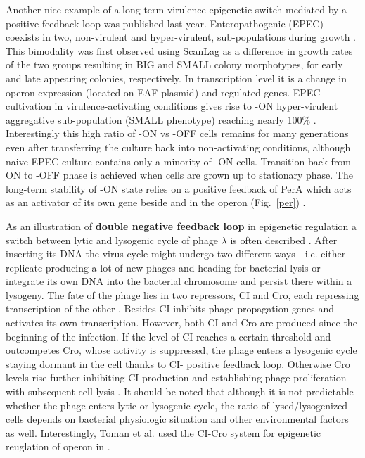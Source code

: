 Another nice example of a long-term virulence epigenetic switch mediated by a positive feedback loop was published last year.
Enteropathogenic  (EPEC) coexists in two, non-virulent and hyper-virulent, sub-populations during growth \cite{ronin2017long}.
This bimodality was first observed  using ScanLag \cite{levin2014scanlag} as a difference in growth rates of the two groups resulting in BIG and SMALL colony morphotypes, for early and late appearing colonies, respectively.
In transcription level it is a change in  operon expression (located on EAF plasmid) and  regulated genes.
EPEC cultivation in virulence-activating conditions gives rise to -ON hyper-virulent aggregative sub-population (SMALL phenotype) reaching nearly 100\% \cite{ronin2017long}.
Interestingly this high ratio of -ON vs -OFF cells remains for many generations even after transferring the culture back into non-activating conditions, although naive EPEC culture contains only a minority of -ON cells.
Transition back from -ON to -OFF phase is achieved when cells are grown up to stationary phase.
The long-term stability of -ON state relies on a positive feedback of PerA which acts as an activator of its own gene beside  and  in the  operon (Fig.~\ref{per}) \cite{ibarra2003identification, ronin2017long}.

As an illustration of \textbf{double negative feedback loop} in epigenetic regulation a switch between lytic and lysogenic cycle of  phage $\lambda$ is often described \cite{smits2006phenotypic, casadesus2013programmed}.
After inserting its DNA the virus cycle might undergo two different ways - i.e. either replicate producing a lot of new phages and heading for bacterial lysis or integrate its own DNA into the bacterial chromosome and persist there within a lysogeny.
The fate of the phage lies in two repressors, CI and Cro, each repressing transcription of the other \cite{eisen1970regulation, neubauer1970immunity}.
Besides CI inhibits phage propagation genes and activates its own transcription.
However, both CI and Cro are produced since the beginning of the infection.
If the level of CI reaches a certain threshold and outcompetes Cro, whose activity is suppressed, the phage enters a lysogenic cycle staying dormant in the cell thanks to CI- positive feedback loop.
Otherwise Cro levels rise further inhibiting CI production and establishing phage proliferation with subsequent cell lysis \cite{svenningsen2005role}.
It should be noted that although it is not predictable whether the phage enters lytic or lysogenic cycle, the ratio of lysed/lysogenized cells depends on bacterial physiologic situation and other environmental factors as well.
Interestingly, Toman et al. used the CI-Cro system for epigenetic reuglation of  operon in  \cite{toman1985system}.

